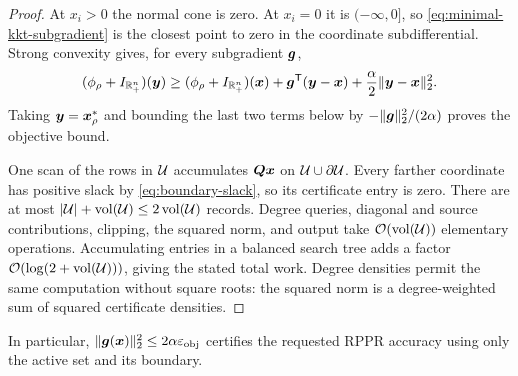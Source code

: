 \begin{proof}
At $x_i>0$ the normal cone is zero.  At $x_i=0$ it is $(-\infty,0]$, so
\cref{eq:minimal-kkt-subgradient} is the closest point to zero in the
coordinate subdifferential.  Strong convexity gives, for every subgradient
$\bm{g}$,
\[
 (\phi_\rho+I_{\mathbb{R}_+^n})(\bm{y})\geq(\phi_\rho+I_{\mathbb{R}_+^n})(\bm{x})
 +\bm{g}^{\mathsf{T}}(\bm{y}-\bm{x})+\frac\alpha2\lVert\bm{y}-\bm{x}\rVert_2^2.
\]
Taking $\bm{y}=\bm{x}_\rho^*$ and bounding the last two terms below by
$-\lVert\bm{g}\rVert_2^2/(2\alpha)$ proves the objective bound.

One scan of the rows in $\mathcal{U}$ accumulates $\bm{Q}\bm{x}$ on
$\mathcal{U}\cup\partial\mathcal{U}$. Every farther coordinate has positive slack by
\cref{eq:boundary-slack}, so its certificate entry is zero.
There are at most $|\mathcal{U}|+\operatorname{vol}(\mathcal{U})\leq2\operatorname{vol}(\mathcal{U})$ records.
Degree queries, diagonal and source contributions, clipping, the squared
norm, and output take $\mathcal{O}(\operatorname{vol}(\mathcal{U}))$ elementary operations.
Accumulating entries in a balanced search tree adds a factor
$\mathcal{O}(\log(2+\operatorname{vol}(\mathcal{U})))$, giving the stated total work.
Degree densities permit the same computation without square roots:
the squared norm is a degree-weighted sum of squared certificate densities.
\end{proof}

In particular, $\lVert\bm{g}(\bm{x})\rVert_2^2\leq2\alpha\varepsilon_{\mathrm{obj}}$ certifies the
requested RPPR accuracy using only the active set and its boundary.
